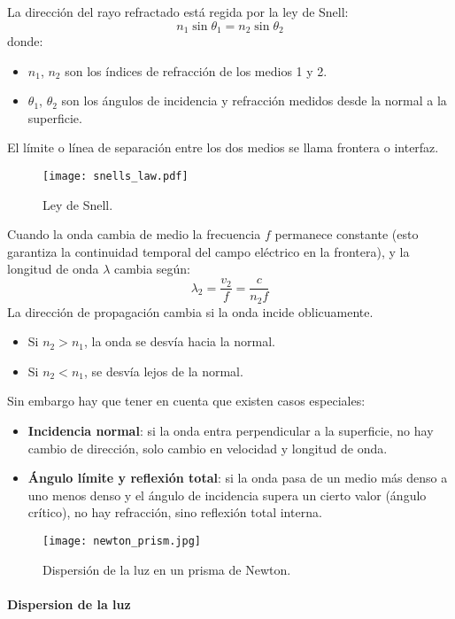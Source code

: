 La dirección del rayo refractado está regida por la ley de Snell:
\[
n_1 \sin \theta_1 = n_2 \sin \theta_2
\]
donde:
\begin{itemize}
  \item \(n_1\), \(n_2\) son los índices de refracción de los medios 1 y 2.
  \item \(\theta_1\), \(\theta_2\) son los ángulos de incidencia y refracción medidos desde la normal a la superficie.
\end{itemize}

El límite o línea de separación entre los dos medios se llama frontera o interfaz.

\begin{figure}[ht]
  \centering
  \texttt{[image: snells\_law.pdf]}
  \caption{Ley de Snell.}
  \label{fig:snells_law}
\end{figure}

Cuando la onda cambia de medio la frecuencia \(f\) permanece constante (esto garantiza la continuidad temporal del campo eléctrico en la frontera), y la longitud de onda \(\lambda\) cambia según:
\[
\lambda_2 = \frac{v_2}{f} = \frac{c}{n_2 f}
\]
La dirección de propagación cambia si la onda incide oblicuamente.
\begin{itemize}
  \item Si \(n_2 > n_1\), la onda se desvía hacia la normal.
  \item Si \(n_2 < n_1\), se desvía lejos de la normal.
\end{itemize}
Sin embargo hay que tener en cuenta que existen casos especiales:
\begin{itemize}
  \item \textbf{Incidencia normal}: si la onda entra perpendicular a la superficie, no hay cambio de dirección, solo cambio en velocidad y longitud de onda.
  \item \textbf{Ángulo límite y reflexión total}: si la onda pasa de un medio más denso a uno menos denso y el ángulo de incidencia supera un cierto valor (ángulo crítico), no hay refracción, sino reflexión total interna.
\end{itemize}


\begin{wrapfigure}{r}{0.25\textwidth}
  \centering
  \texttt{[image: newton\_prism.jpg]}
  \caption{Dispersión de la luz en un prisma de Newton.}
  \label{fig:newton_prism}
\end{wrapfigure}
\paragraph{Dispersion de la luz}

